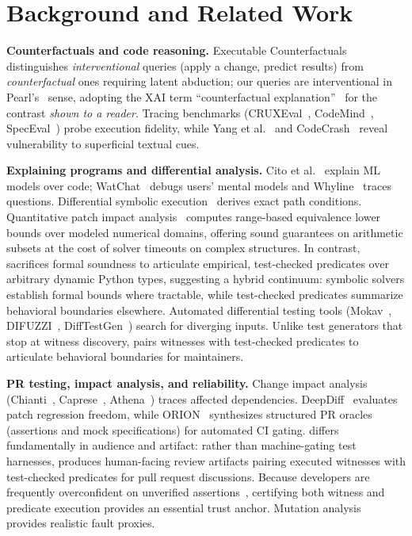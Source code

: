 \section{Background and Related Work}\label{sec:related}
\textbf{Counterfactuals and code reasoning.}
Executable Counterfactuals~\cite{vashishtha2026executable} distinguishes \emph{interventional} queries (apply a change, predict results) from \emph{counterfactual} ones requiring latent abduction; our queries are interventional in Pearl's~\cite{pearl2009causality} sense, adopting the XAI term ``counterfactual explanation''~\cite{wachter2018counterfactual,miller2019explanation} for the contrast \emph{shown to a reader}. Tracing benchmarks (CRUXEval~\cite{gu2024cruxeval}, CodeMind~\cite{liu2024codemind}, SpecEval~\cite{wang2024speceval}) probe execution fidelity, while Yang et al.~\cite{yang2025reversion} and CodeCrash~\cite{lam2025codecrash} reveal vulnerability to superficial textual cues.

\textbf{Explaining programs and differential analysis.} Cito et al.~\cite{cito2022counterfactual} explain ML models over code;
WatChat~\cite{chandra2024watchat} debugs users' mental models and Whyline~\cite{ko2008whyline} traces questions. Differential symbolic execution~\cite{person2008dse} derives exact path conditions. Quantitative patch impact analysis~\cite{sarker2026impact} computes range-based equivalence lower bounds over modeled numerical domains, offering sound guarantees on arithmetic subsets at the cost of solver timeouts on complex structures. In contrast, \CoDE sacrifices formal soundness to articulate empirical, test-checked predicates over arbitrary dynamic Python types, suggesting a hybrid continuum: symbolic solvers establish formal bounds where tractable, while test-checked predicates summarize behavioral boundaries elsewhere. Automated differential testing tools (Mokav~\cite{etemadi2024mokav}, DIFUZZI~\cite{sun2024difuzzi}, DiffTestGen~\cite{hu2026difftestgen}) search for diverging inputs. Unlike test generators that stop at witness discovery, \CoDE pairs witnesses with test-checked predicates to articulate behavioral boundaries for maintainers.

\textbf{PR testing, impact analysis, and reliability.} Change impact analysis (Chianti~\cite{ren2004chianti}, Caprese~\cite{fard2023caprese}, Athena~\cite{tufano2023athena}) traces affected dependencies. DeepDiff~\cite{sarker2026deepdiff} evaluates patch regression freedom, while ORION~\cite{fu2026orion} synthesizes structured PR oracles (assertions and mock specifications) for automated CI gating. \CoDE differs fundamentally in audience and artifact: rather than machine-gating test harnesses, \CoDE produces human-facing review artifacts pairing executed witnesses with test-checked predicates for pull request discussions. Because developers are frequently overconfident on unverified assertions~\cite{kaufman2026judges,rong2026behavioral}, certifying both witness and predicate execution provides an essential trust anchor. Mutation analysis~\cite{jia2011mutation,just2014mutants} provides realistic fault proxies.
